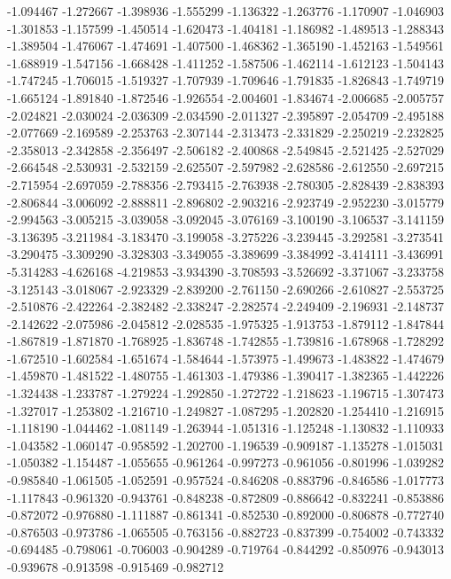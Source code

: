 -1.094467
-1.272667
-1.398936
-1.555299
-1.136322
-1.263776
-1.170907
-1.046903
-1.301853
-1.157599
-1.450514
-1.620473
-1.404181
-1.186982
-1.489513
-1.288343
-1.389504
-1.476067
-1.474691
-1.407500
-1.468362
-1.365190
-1.452163
-1.549561
-1.688919
-1.547156
-1.668428
-1.411252
-1.587506
-1.462114
-1.612123
-1.504143
-1.747245
-1.706015
-1.519327
-1.707939
-1.709646
-1.791835
-1.826843
-1.749719
-1.665124
-1.891840
-1.872546
-1.926554
-2.004601
-1.834674
-2.006685
-2.005757
-2.024821
-2.030024
-2.036309
-2.034590
-2.011327
-2.395897
-2.054709
-2.495188
-2.077669
-2.169589
-2.253763
-2.307144
-2.313473
-2.331829
-2.250219
-2.232825
-2.358013
-2.342858
-2.356497
-2.506182
-2.400868
-2.549845
-2.521425
-2.527029
-2.664548
-2.530931
-2.532159
-2.625507
-2.597982
-2.628586
-2.612550
-2.697215
-2.715954
-2.697059
-2.788356
-2.793415
-2.763938
-2.780305
-2.828439
-2.838393
-2.806844
-3.006092
-2.888811
-2.896802
-2.903216
-2.923749
-2.952230
-3.015779
-2.994563
-3.005215
-3.039058
-3.092045
-3.076169
-3.100190
-3.106537
-3.141159
-3.136395
-3.211984
-3.183470
-3.199058
-3.275226
-3.239445
-3.292581
-3.273541
-3.290475
-3.309290
-3.328303
-3.349055
-3.389699
-3.384992
-3.414111
-3.436991
-5.314283
-4.626168
-4.219853
-3.934390
-3.708593
-3.526692
-3.371067
-3.233758
-3.125143
-3.018067
-2.923329
-2.839200
-2.761150
-2.690266
-2.610827
-2.553725
-2.510876
-2.422264
-2.382482
-2.338247
-2.282574
-2.249409
-2.196931
-2.148737
-2.142622
-2.075986
-2.045812
-2.028535
-1.975325
-1.913753
-1.879112
-1.847844
-1.867819
-1.871870
-1.768925
-1.836748
-1.742855
-1.739816
-1.678968
-1.728292
-1.672510
-1.602584
-1.651674
-1.584644
-1.573975
-1.499673
-1.483822
-1.474679
-1.459870
-1.481522
-1.480755
-1.461303
-1.479386
-1.390417
-1.382365
-1.442226
-1.324438
-1.233787
-1.279224
-1.292850
-1.272722
-1.218623
-1.196715
-1.307473
-1.327017
-1.253802
-1.216710
-1.249827
-1.087295
-1.202820
-1.254410
-1.216915
-1.118190
-1.044462
-1.081149
-1.263944
-1.051316
-1.125248
-1.130832
-1.110933
-1.043582
-1.060147
-0.958592
-1.202700
-1.196539
-0.909187
-1.135278
-1.015031
-1.050382
-1.154487
-1.055655
-0.961264
-0.997273
-0.961056
-0.801996
-1.039282
-0.985840
-1.061505
-1.052591
-0.957524
-0.846208
-0.883796
-0.846586
-1.017773
-1.117843
-0.961320
-0.943761
-0.848238
-0.872809
-0.886642
-0.832241
-0.853886
-0.872072
-0.976880
-1.111887
-0.861341
-0.852530
-0.892000
-0.806878
-0.772740
-0.876503
-0.973786
-1.065505
-0.763156
-0.882723
-0.837399
-0.754002
-0.743332
-0.694485
-0.798061
-0.706003
-0.904289
-0.719764
-0.844292
-0.850976
-0.943013
-0.939678
-0.913598
-0.915469
-0.982712
